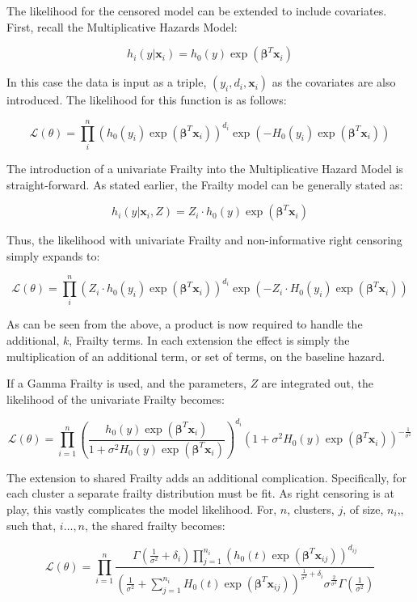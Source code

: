 The likelihood for the censored model can be extended to include covariates. First, recall the Multiplicative Hazards Model:

$$ h_i(y|\textbf{x}_i) = h_0(y) \exp(\boldsymbol\beta^T \textbf{x}_i) $$

In this case the data is input as a triple, $(y_i, d_i, \textbf{x}_i)$ as the covariates are also introduced. The likelihood for this function is as follows:

$$ \mathcal {L}(\theta) = \prod^n_i \left (h_0(y_i) \exp(\boldsymbol\beta^T \textbf{x}_i)  \right )^{d_i} \exp(-H_0(y_i) \exp(\boldsymbol\beta^T \textbf{x}_i)) $$

The introduction of a univariate Frailty into the Multiplicative Hazard Model is straight-forward. As stated earlier, the Frailty model can be generally stated as:

$$ h_{i}(y|\textbf{x}_i, Z) = Z_i \cdot h_0(y) \exp(\boldsymbol\beta^T \textbf{x}_{i})  $$

Thus, the likelihood with univariate Frailty and non-informative right censoring simply expands to:

$$ \mathcal {L}(\theta) = \prod^n_i \left (Z_i \cdot h_0(y_i) \exp(\boldsymbol\beta^T \textbf{x}_i)  \right )^{d_i} \exp(-Z_i \cdot H_0(y_i) \exp(\boldsymbol\beta^T \textbf{x}_i)) $$

As can be seen from the above, a product is now required to handle the additional, $k$, Frailty terms. In each extension the effect is simply the multiplication of an additional term, or set of terms, on the baseline hazard.

If a Gamma Frailty is used, and the parameters, $Z$ are integrated out, the likelihood of the univariate Frailty becomes: 

$$ \mathcal {L}(\theta) = \prod_{i=1}^n \left (\frac{h_0(y) \exp(\boldsymbol\beta^T \textbf{x}_i)}{1+ \sigma^2 H_0(y) \exp(\boldsymbol\beta^T \textbf{x}_i)}  \right )^{d_i} (1+ \sigma^2 H_0(y) \exp(\boldsymbol\beta^T \textbf{x}_i))^{-\frac{1}{\sigma^2}} $$

The extension to shared Frailty adds an additional complication. Specifically, for each cluster a separate frailty distribution must be fit. As right censoring is at play, this vastly complicates the model likelihood. For, $n$, clusters, $j$, of size, $n_i$,, such that, $i \dots, n$, the shared frailty becomes\cite{Wienke2010}:

$$ \mathcal {L}(\theta) =\prod_{i=1}^n \frac{\Gamma(\frac{1}{\sigma^2} + \delta_i) \prod^{n_i}_{j=1} (h_0(t) \exp(\boldsymbol\beta^T \textbf{x}_{ij}))^{d_{ij}} }{(\frac{1}{\sigma^2} + \sum_{j =1}^{n_i} H_0(t) \exp(\boldsymbol\beta^T \textbf{x}_{ij}))^{\frac{1}{\sigma^2} + \delta_i} \sigma^{\frac{2}{\sigma^2}} \Gamma(\frac{1}{\sigma^2})} $$

